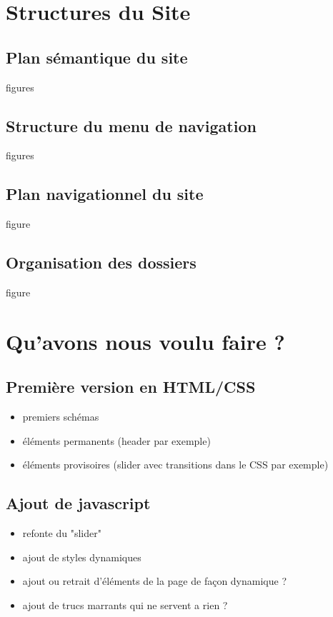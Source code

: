 \documentclass{scrartcl}
\begin{document}
\section{Structures du Site}
\subsection{Plan sémantique du site}
figures
\subsection{Structure du menu de navigation}
figures
\subsection{Plan navigationnel du site}
figure
\subsection{Organisation des dossiers}
figure

\section{Qu'avons nous voulu faire ?}
\subsection{Première version en HTML/CSS}
\begin{itemize}
\item premiers schémas
\item éléments permanents (header par exemple)
\item éléments provisoires (slider avec transitions dans le CSS par exemple)
\end{itemize}


\subsection{Ajout de javascript}
\begin{itemize}
\item refonte du "slider"
\item ajout de styles dynamiques
\item ajout ou retrait d'éléments de la page de façon dynamique ?
\item ajout de trucs marrants qui ne servent a rien ?
\end{itemize}
\end{document}
